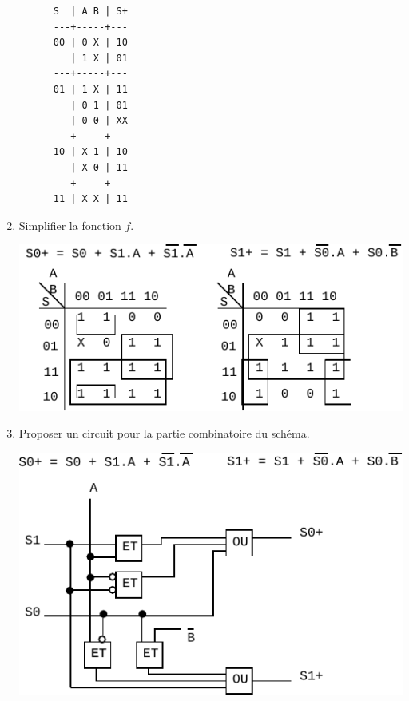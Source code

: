 \documentclass[a4paper,10pt]{exam}
\begin{document}
\begin{enumerate}
\begin{solution}
      \begin{verbatim}
      S  | A B | S+
      ---+-----+---
      00 | 0 X | 10
         | 1 X | 01
      ---+-----+---
      01 | 1 X | 11
         | 0 1 | 01
         | 0 0 | XX
      ---+-----+---
      10 | X 1 | 10
         | X 0 | 11
      ---+-----+---
      11 | X X | 11
      \end{verbatim}
    \end{solution}
  \item Simplifier la fonction $f$.
    \begin{solution}
      \includegraphics{TD9-auto}
    \end{solution}
  \item Proposer un circuit pour la partie combinatoire du schéma.
    \begin{solution}
      \includegraphics{TD9-auto1}
    \end{solution}


\end{enumerate}
\end{document}
